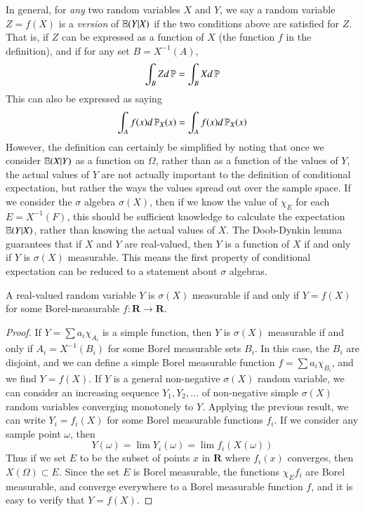 In general, for {\it any} two random variables $X$ and $Y$, we say a random variable $Z = f(X)$ is a {\it version} of $\operatorname{\mathbb{E}}(Y|X)$ if the two conditions above are satisfied for $Z$. That is, if $Z$ can be expressed as a function of $X$ (the function $f$ in the definition), and if for any set $B = X^{-1}(A)$,
%
\[ \int_B Z d\operatorname{\mathbb{P}} = \int_B X d\operatorname{\mathbb{P}} \]
%
This can also be expressed as saying
%
\[ \int_A f(x) d\operatorname{\mathbb{P}}_X(x) = \int_A f(x) d\operatorname{\mathbb{P}}_X(x) \]
%
However, the definition can certainly be simplified by noting that once we consider $\operatorname{\mathbb{E}}(X|Y)$ as a function on $\Omega$, rather than as a function of the values of $Y$, the actual values of $Y$ are not actually important to the definition of conditional expectation, but rather the ways the values spread out over the sample space. If we consider the $\sigma$ algebra $\sigma(X)$, then if we know the value of $\chi_E$ for each $E = X^{-1}(F)$, this should be sufficient knowledge to calculate the expectation $\operatorname{\mathbb{E}}(Y|X)$, rather than knowing the actual values of $X$. The Doob-Dynkin lemma guarantees that if $X$ and $Y$ are real-valued, then $Y$ is a function of $X$ if and only if $Y$ is $\sigma(X)$ measurable. This means the first property of conditional expectation can be reduced to a statement about $\sigma$ algebras.

\begin{lemma}
    A real-valued random variable $Y$ is $\sigma(X)$ measurable if and only if $Y = f(X)$ for some Borel-measurable $f: \mathbf{R} \to \mathbf{R}$.
\end{lemma}
\begin{proof}
    If $Y = \sum a_i \chi_{A_i}$ is a simple function, then $Y$ is $\sigma(X)$ measurable if and only if $A_i = X^{-1}(B_i)$ for some Borel measurable sets $B_i$. In this case, the $B_i$ are disjoint, and we can define a simple Borel measurable function $f = \sum a_i \chi_{B_i}$, and we find $Y = f(X)$. If $Y$ is a general non-negative $\sigma(X)$ random variable, we can consider an increasing sequence $Y_1, Y_2, \dots$ of non-negative simple $\sigma(X)$ random variables converging monotonely to $Y$. Applying the previous result, we can write $Y_i = f_i(X)$ for some Borel measurable functions $f_i$. If we consider any sample point $\omega$, then
    \[ Y(\omega) = \lim Y_i(\omega) = \lim f_i(X(\omega)) \]
    Thus if we set $E$ to be the subset of points $x$ in $\mathbf{R}$ where $f_i(x)$ converges, then $X(\Omega) \subset E$. Since the set $E$ is Borel measurable, the functions $\chi_E f_i$ are Borel measurable, and converge everywhere to a Borel measurable function $f$, and it is easy to verify that $Y = f(X)$.
\end{proof}

